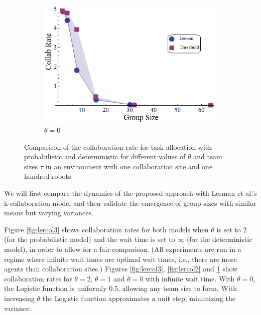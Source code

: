 \documentclass{TeXstyles/DARS/svmult}  %
\begin{document}
\begin{figure}[!htb]
\begin{subfigure}{0.33\textwidth}
\centering\includegraphics[width=1.0\textwidth]{figures/LermanCollabCompare1.png}
\centering\caption{$\theta=0$}\label{fig:lercol1}
\end{subfigure}
\caption{Comparison of the collaboration rate for task allocation with probabilistic and deterministic \cite{Lerman2001} for different values of $\theta$ and team sizes $\tau$ in an environment with one collaboration site and one hundred robots. }\label{fig:lercol}
\end{figure}

We will first compare the dynamics of the proposed approach with Lerman et al.'s k-collaboration model \cite{Lerman2001} and then validate the emergence of group sizes with similar means but varying variances.

Figure \ref{fig:lercol3} shows collaboration rates for both models when $\theta$ is set to 2 (for the probabilistic model) and the wait time is set to $\infty$ (for the deterministic model), in order to allow for a fair comparison. (All experiments are run in a regime where infinite wait times are optimal wait times, i.e., there are more agents than collaboration sites.) Figures \ref{fig:lercol3}, \ref{fig:lercol2} and \ref{fig:lercol1} show collaboration rates for $\theta = 2$, $\theta = 1$ and $\theta=0$ with infinite wait time. With $\theta=0$, the Logistic function is uniformly 0.5, allowing any team size to form.  
With increasing $\theta$ the Logistic function approximates a unit step, minimizing the variance. 
\end{document}
